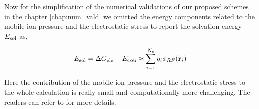 Now for the simplification of the numerical validations of our proposed schemes in the chapter \ref{chap:num_vald} we omitted the energy components related to the mobile ion pressure and the electrostatic stress to report the solvation energy $E_{\rm sol}$ as,  

\begin{eqnarray}
	E_{\rm sol}=\Delta G_{\rm ele}-E_{\rm cou}\approx\sum\limits_{i=1}^{N_c}q_i\phi_{RF} ({\bf r}_i)\label{eq:solvation}
\end{eqnarray}

Here the contribution of the mobile ion pressure and the electrostatic stress to the whole calculation is really small and computationally more challenging. The readers can refer to \cite{GENG_WEI2011,Gilson,Sharp_Honig} for more details.	 
